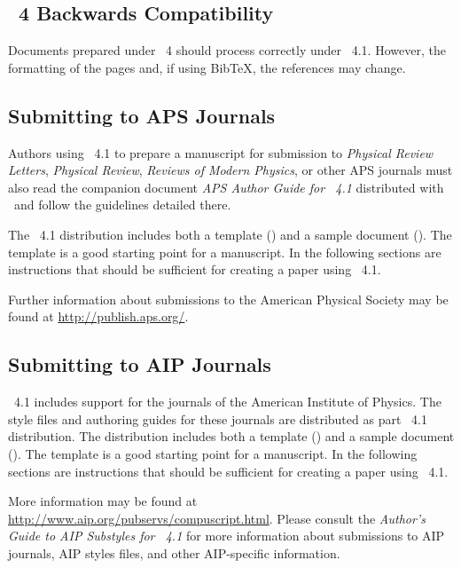 \documentclass[%
,aps%
 ,twocolumn%
 ,secnumarabic%
,amssymb, amsmath,nobibnotes, aps, prl, floatfix]{revtex4-1}
\begin{document}
\subsection{\revtex~4 Backwards Compatibility}
Documents prepared under \revtex~4 should process correctly under \revtex~4.1. However, the formatting of the pages and, if using Bib\TeX, the references may change.



\subsection{Submitting to APS Journals}

Authors using \revtex~4.1 to prepare a manuscript for submission to
\textit{Physical Review Letters}, \textit{Physical Review},  \textit{Reviews of Modern Physics}, 
or other APS journals must also read the companion document \textit{APS Author Guide for \revtex~4.1}
distributed with \revtex\ and follow the guidelines detailed there.

The \revtex~4.1 distribution includes both a template
() and a sample document ().
The template is a good starting point for a manuscript. In the
following sections are instructions that should be sufficient for
creating a paper using \revtex~4.1.

Further information about submissions to the American
Physical Society may be found at \url{http://publish.aps.org/}.

\subsection{Submitting to AIP Journals}

\revtex~4.1 includes support for the journals of the American Institute of Physics.
The style files and authoring guides for these journals are distributed as part
\revtex~4.1 distribution. The distribution includes both a template
() and a sample document ().
The template is a good starting point for a manuscript. In the
following sections are instructions that should be sufficient for
creating a paper using \revtex~4.1.



More information may be found at 
\url{http://www.aip.org/pubservs/compuscript.html}. Please consult the \textit{Author's Guide to AIP Substyles for \revtex~4.1} for more information about submissions to AIP journals, AIP styles files, and other AIP-specific information.
\end{document}
